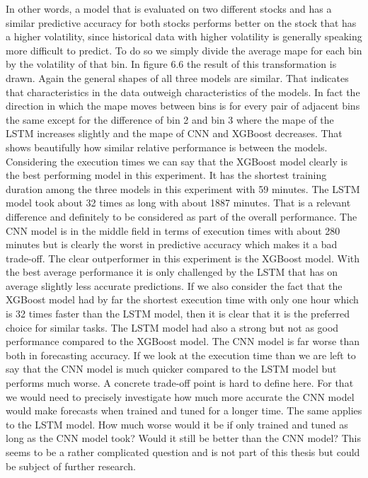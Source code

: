 \documentclass[a4paper,12pt]{report}
\begin{document}
In other words, a model that is evaluated on two different stocks and has a similar predictive accuracy for both stocks performs better on the stock that has a higher volatility, since historical data with higher volatility is generally speaking more difficult to predict. To do so we simply divide the average mape for each bin by the volatility of that bin. In figure 6.6 the result of this transformation is drawn. Again the general shapes of all three models are similar. That indicates that characteristics in the data outweigh characteristics of the models. In fact the direction in which the mape moves between bins is for every pair of adjacent bins the same except for the difference of bin 2 and bin 3 where the mape of the LSTM increases slightly and the mape of CNN and XGBoost decreases. That shows beautifully how similar relative performance is between the models. Considering the execution times we can say that the XGBoost model clearly is the best performing model in this experiment. It has the shortest training duration among the three models in this experiment with 59 minutes. The LSTM model took about 32 times as long with about 1887 minutes. That is a relevant difference and definitely to be considered as part of the overall performance. The CNN model is in the middle field in terms of execution times with about 280 minutes but is clearly the worst in predictive accuracy which makes it a bad trade-off. The clear outperformer in this experiment is the XGBoost model. With the best average performance it is only challenged by the LSTM that has on average slightly less accurate predictions. If we also consider the fact that the XGBoost model had by far the shortest execution time with only one hour which is 32 times faster than the LSTM model, then it is clear that it is the preferred choice for similar tasks. The LSTM model had also a strong but not as good performance compared to the XGBoost model. The CNN model is far worse than both in forecasting accuracy. If we look at the execution time than we are left to say that the CNN model is much quicker compared to the LSTM model but performs much worse. A concrete trade-off point is hard to define here. For that we would need to precisely investigate how much more accurate the CNN model would make forecasts when trained and tuned for a longer time. The same applies to the LSTM model. How much worse would it be if only trained and tuned as long as the CNN model took? Would it still be better than the CNN model? This seems to be a rather complicated question and is not part of this thesis but could be subject of further research. 
\end{document}
